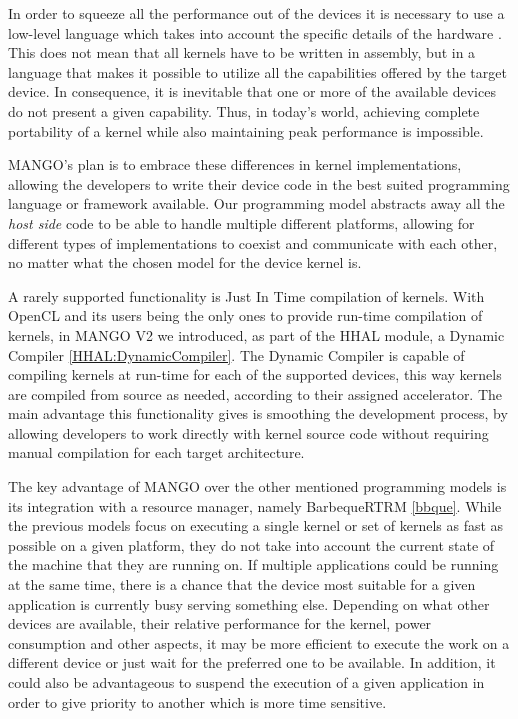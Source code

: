 In order to squeeze all the performance out of the devices it is necessary to use a low-level language which takes into account the specific details of the hardware \cite{cuda_open_source_compiler}. This does not mean that all kernels have to be written in assembly, but in a language that makes it possible to utilize all the capabilities offered by the target device. In consequence, it is inevitable that one or more of the available devices do not present a given capability. Thus, in today's world, achieving complete portability of a kernel while also maintaining peak performance is impossible.

MANGO's plan is to embrace these differences in kernel implementations, allowing the developers to write their device code in the best suited programming language or framework available. Our programming model abstracts away all the \textit{host side} code to be able to handle multiple different platforms, allowing for different types of implementations to coexist and communicate with each other, no matter what the chosen model for the device kernel is.

A rarely supported functionality is Just In Time compilation of kernels. With OpenCL and its users being the only ones to provide run-time compilation of kernels, in MANGO V2 we introduced, as part of the HHAL module, a Dynamic Compiler \ref{HHAL:DynamicCompiler}. The Dynamic Compiler is capable of compiling kernels at run-time for each of the supported devices, this way kernels are compiled from source as needed, according to their assigned accelerator.
The main advantage this functionality gives is smoothing the development process, by allowing developers to work directly with kernel source code without requiring manual compilation for each target architecture.

The key advantage of MANGO over the other mentioned programming models is its integration with a resource manager, namely BarbequeRTRM \ref{bbque}. While the previous models focus on executing a single kernel or set of kernels as fast as possible on a given platform, they do not take into account the current state of the machine that they are running on. If multiple applications could be running at the same time, there is a chance that the device most suitable for a given application is currently busy serving something else. Depending on what other devices are available, their relative performance for the kernel, power consumption and other aspects, it may be more efficient to execute the work on a different device or just wait for the preferred one to be available. In addition, it could also be advantageous to suspend the execution of a given application in order to give priority to another which is more time sensitive.


